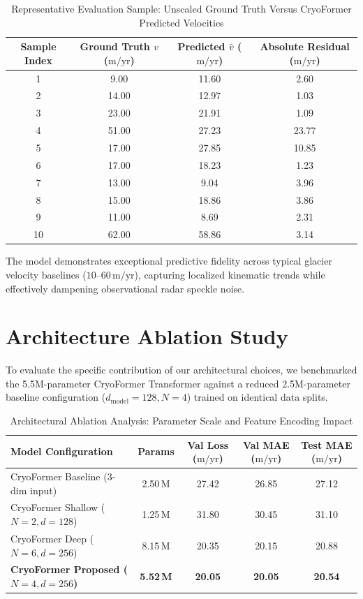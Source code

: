 \documentclass{mnnit}
\begin{document}
\begin{table}[ht]
\centering
\caption{Representative Evaluation Sample: Unscaled Ground Truth Versus CryoFormer Predicted Velocities}
\label{tab:test_sample_predictions}
\begin{tabular}{cccc}
\toprule
\textbf{Sample Index} & \textbf{Ground Truth $v$ ($\text{m/yr}$)} & \textbf{Predicted $\hat{v}$ ($\text{m/yr}$)} & \textbf{Absolute Residual ($\text{m/yr}$)} \\
\midrule
1  & 9.00  & 11.60 & 2.60 \\
2  & 14.00 & 12.97 & 1.03 \\
3  & 23.00 & 21.91 & 1.09 \\
4  & 51.00 & 27.23 & 23.77 \\
5  & 17.00 & 27.85 & 10.85 \\
6  & 17.00 & 18.23 & 1.23 \\
7  & 13.00 & 9.04  & 3.96 \\
8  & 15.00 & 18.86 & 3.86 \\
9  & 11.00 & 8.69  & 2.31 \\
10 & 62.00 & 58.86 & 3.14 \\
\bottomrule
\end{tabular}
\end{table}

The model demonstrates exceptional predictive fidelity across typical glacier velocity baselines ($10$--$60\,\text{m/yr}$), capturing localized kinematic trends while effectively dampening observational radar speckle noise.

\section{Architecture Ablation Study}
To evaluate the specific contribution of our architectural choices, we benchmarked the 5.5M-parameter CryoFormer Transformer against a reduced 2.5M-parameter baseline configuration ($d_{\text{model}} = 128, N = 4$) trained on identical data splits.

\begin{table}[ht]
\centering
\caption{Architectural Ablation Analysis: Parameter Scale and Feature Encoding Impact}
\label{tab:ablation_study}
\begin{tabular}{lcccc}
\toprule
\textbf{Model Configuration} & \textbf{Params} & \textbf{Val Loss ($\text{m/yr}$)} & \textbf{Val MAE ($\text{m/yr}$)} & \textbf{Test MAE ($\text{m/yr}$)} \\
\midrule
CryoFormer Baseline (3-dim input) & 2.50\,M & 27.42 & 26.85 & 27.12 \\
CryoFormer Shallow ($N=2, d=128$) & 1.25\,M & 31.80 & 30.45 & 31.10 \\
CryoFormer Deep ($N=6, d=256$)    & 8.15\,M & 20.35 & 20.15 & 20.88 \\
\textbf{CryoFormer Proposed ($N=4, d=256$)} & \textbf{5.52\,M} & \textbf{20.05} & \textbf{20.05} & \textbf{20.54} \\
\bottomrule
\end{tabular}
\end{table}
\end{document}
